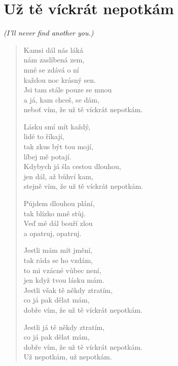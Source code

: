 \section*{Už tě víckrát nepotkám}
\textit{(I'll never find another you.)}

\begin{verse}
Kamsi dál nás láká \\
nám zaslíbená zem,\\
mně se zdává o ní\\
každou noc krásný sen.\\
Jsi tam stále pouze se mnou\\
a já, kam chceš, se dám,\\
neboť vím, že už tě víckrát nepotkám.

Lásku smí mít každý, \\
lidé to říkají, \\
tak zkus být tou mojí, \\
líbej mě potají. \\
Kdybych já šla cestou dlouhou, \\
jen dál, až bůhví kam, \\
stejně vím, že už tě víckrát nepotkám.

Půjdem dlouhou plání, \\
tak blízko mně stůj. \\
Veď mě dál bouří zlou \\
a opatruj, opatruj. 

Jestli mám mít jmění, \\
tak ráda se ho vzdám, \\
to mi vzácné vůbec není, \\
jen když tvou lásku mám. \\
Jestli však tě někdy ztratím, \\
co já pak dělat mám, \\
dobře vím, že už tě víckrát nepotkám. 

Jestli já tě někdy ztratím, \\
co já pak dělat mám, \\
dobře vím, že už tě víckrát nepotkám. \\
Už nepotkám, už nepotkám.
\end{verse}

